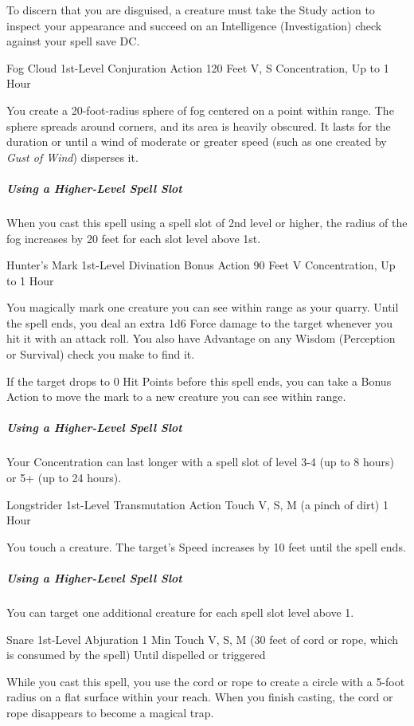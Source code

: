 \documentclass[letterpaper,openany,oneside,twocolumn]{book}
\begin{document}
To discern that you are disguised, a creature must take the Study action to inspect your appearance and succeed on an Intelligence (Investigation) check against your spell save DC.

\DndSpellHeader
  {Fog Cloud}
  {1st-Level Conjuration}
  {Action}
  {120 Feet}
  {V, S}
  {Concentration, Up to 1 Hour}

You create a 20-foot-radius sphere of fog centered on a point within range. The sphere spreads around corners, and its area is heavily obscured. It lasts for the duration or until a wind of moderate or greater speed (such as one created by \textit{Gust of Wind}) disperses it.

\subparagraph*{Using a Higher-Level Spell Slot} When you cast this spell using a spell slot of 2nd level or higher, the radius of the fog increases by 20 feet for each slot level above 1st.

\DndSpellHeader
  {Hunter's Mark}
  {1st-Level Divination}
  {Bonus Action}
  {90 Feet}
  {V}
  {Concentration, Up to 1 Hour}

You magically mark one creature you can see within range as your quarry. Until the spell ends, you deal an extra 1d6 Force damage to the target whenever you hit it with an attack roll. You also have Advantage on any Wisdom (Perception or Survival) check you make to find it.

If the target drops to 0 Hit Points before this spell ends, you can take a Bonus Action to move the mark to a new creature you can see within range.

\subparagraph*{Using a Higher-Level Spell Slot} Your Concentration can last longer with a spell slot of level 3-4 (up to 8 hours) or 5+ (up to 24 hours).

\DndSpellHeader
  {Longstrider}
  {1st-Level Transmutation}
  {Action}
  {Touch}
  {V, S, M (a pinch of dirt)}
  {1 Hour}

You touch a creature. The target's Speed increases by 10 feet until the spell ends.

\subparagraph*{Using a Higher-Level Spell Slot} You can target one additional creature for each spell slot level above 1.

\DndSpellHeader
  {Snare}
  {1st-Level Abjuration}
  {1 Min}
  {Touch}
  {V, S, M (30 feet of cord or rope, which is consumed by the spell)}
  {Until dispelled or triggered}

While you cast this spell, you use the cord or rope to create a circle with a 5-foot radius on a flat surface within your reach. When you finish casting, the cord or rope disappears to become a magical trap.
\end{document}
